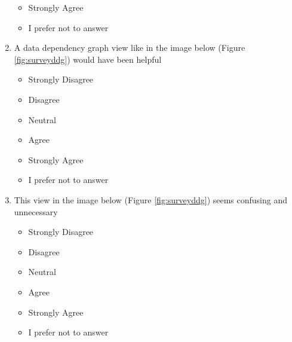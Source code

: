 \begin{enumerate}
\begin{itemize}
        \item Strongly Agree
        \item I prefer not to answer
    \end{itemize}
    \item A data dependency graph view like in the image below (Figure \ref{fig:surveyddg})  would have been helpful
    \begin{itemize}
        \item Strongly Disagree
        \item Disagree
        \item Neutral
        \item Agree
        \item Strongly Agree
        \item I prefer not to answer
    \end{itemize}
    \item This view in the image below (Figure \ref{fig:surveyddg}) seems confusing and unnecessary
    \begin{itemize}
        \item Strongly Disagree
        \item Disagree
        \item Neutral
        \item Agree
        \item Strongly Agree
        \item I prefer not to answer
    \end{itemize}
\end{enumerate}


